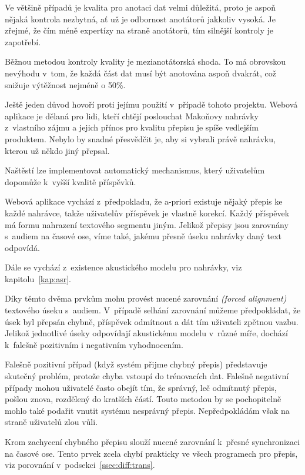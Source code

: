Ve většině případů je kvalita pro anotaci dat velmi důležitá, proto je aspoň
nějaká kontrola nezbytná, ať už je odbornost anotátorů jakkoliv vysoká. Je
zřejmé, že čím méně expertízy na straně anotátorů, tím silnější kontroly je
zapotřebí.

Běžnou metodou kontroly kvality je mezianotátorská shoda. To má obrovskou
nevýhodu v~tom, že každá část dat musí být anotována aspoň dvakrát, což snižuje
výtěžnost nejméně o 50\%.

Ještě jeden důvod hovoří proti jejímu použití v~případě tohoto projektu. Webová
aplikace je dělaná pro lidi, kteří chtějí poslouchat Makoňovy nahrávky
z~vlastního zájmu a jejich přínos pro kvalitu přepisu je spíše vedlejším
produktem. Nebylo by snadné přesvědčit je, aby si vybrali právě nahrávku, kterou
už někdo jiný přepsal.

Naštěstí lze implementovat automatický mechanismus, který uživatelům dopomůže
k~vyšší kvalitě příspěvků.

Webová aplikace vychází z~předpokladu, že a-priori existuje nějaký přepis ke
každé nahrávce, takže uživatelův příspěvek je vlastně korekcí. Každý příspěvek
má formu nahrazení textového segmentu jiným. Jelikož přepisy jsou zarovnány
s~audiem na časové ose, víme také, jakému přesně úseku nahrávky daný text
odpovídá.

Dále se vychází z~existence akustického modelu pro nahrávky, viz kapitolu~\ref{kap:asr}.

Díky těmto dvěma prvkům mohu provést nucené zarovnání {\em (forced alignment)} textového úseku
s~audiem. V~případě selhání zarovnání můžeme předpokládat, že úsek byl přepsán
chybně, příspěvek odmítnout a dát tím uživateli zpětnou vazbu. Jelikož
jednotlivé úseky odpovídají akustickému modelu v~různé míře, dochází k~falešně
pozitivním i negativním vyhodnocením.

Falešně pozitivní případ (když systém přijme chybný přepis) představuje skutečný
problém, protože chyba vstoupí do trénovacích dat. Falešně negativní případy
mohou uživatelé často obejít tím, že správný, leč odmítnutý přepis, pošlou
znova, rozdělený do kratších částí. Touto metodou by se pochopitelně mohlo také
podařit vnutit systému nesprávný přepis. Nepředpokládám však na straně uživatelů
zlou vůli.

Krom zachycení chybného přepisu slouží nucené zarovnání k~přesné synchronizaci
na časové ose. Tento prvek zcela chybí prakticky ve všech programech pro přepis,
viz porovnání v~podsekci~\ref{ssec:diff:trans}.

